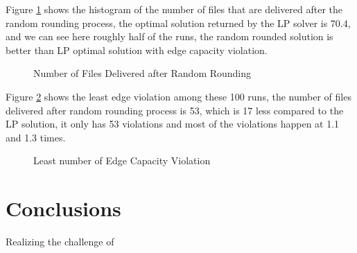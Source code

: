 \documentclass[conference]{IEEEtran}
\begin{document}
Figure \ref{fig:obj_value} shows the histogram of the number of files that are delivered after the random rounding process, the optimal solution returned by the LP solver is 70.4, and we can see here roughly half of the runs, the random rounded solution is better than LP optimal solution with edge capacity violation. 


\begin{figure}
	\begin{center}
		\caption{Number of Files Delivered after Random Rounding}
		\label{fig:obj_value}
	\end{center}
\end{figure}


Figure \ref{fig:best} shows the least edge violation among these 100 runs, the number of files delivered after random rounding process is 53, which is 17 less compared to the LP solution, it only has 53 violations and most of the violations happen at 1.1 and 1.3 times.


\begin{figure}
	\begin{center}
		\caption{Least number of Edge Capacity Violation}
		\label{fig:best}
	\end{center}
\end{figure}



\section{Conclusions}\label{sec:concl}

Realizing the challenge of 




\end{document}
